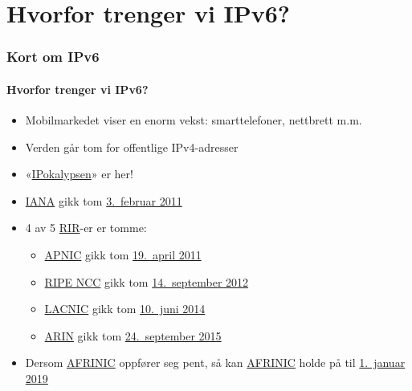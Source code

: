 \section{Hvorfor trenger vi IPv6?}
\begin{frame}%
  \frametitle{Kort om IPv6}
  \framesubtitle{Hvorfor trenger vi IPv6?}
  \pause
  \begin{itemize}[<+->]
  \item Mobilmarkedet viser en enorm vekst: smarttelefoner, nettbrett m.m.
  \item Verden går tom for offentlige IPv4-adresser
  \item
    «\href{http://www.potaroo.net/presentations/2012-05-22-terena.pdf}{IPokalypsen}»
    er her!
  \item \href{http://www.iana.org/}{IANA} gikk tom
    \href{http://www.icann.org/en/news/press/releases/release-03feb11-en.pdf}{3.~februar
      2011}
  \item 4 av 5
    \href{http://en.wikipedia.org/wiki/Regional_Internet_registry}{RIR}-er
    er tomme:
    \begin{itemize}[<+->]
    \item \href{http://www.apnic.net/}{APNIC} gikk tom
      \href{http://www.apnic.net/community/ipv4-exhaustion/graphical-information}{19.~april
        2011}
    \item \href{http://www.ripe.net/}{RIPE NCC} gikk tom
      \href{http://www.ripe.net/internet-coordination/ipv4-exhaustion}{14.~september
        2012}
    \item \href{http://www.lacnic.net/en/web/lacnic/inicio}{LACNIC}
      gikk tom
      \href{http://www.lacnic.net/en/web/lacnic/agotamiento-ipv4}{10.~juni
        2014}
    \item \href{https://www.arin.net/}{ARIN} gikk tom
      \href{https://www.arin.net/announcements/2015/20150924.html}{24.~september
        2015}
    \end{itemize}
  \item Dersom \href{http://www.afrinic.net/}{AFRINIC} oppfører seg
    pent, så kan
    \href{http://afrinic.net/en/community/ipv4-exhaustion}{AFRINIC}
    holde på til \href{http://www.potaroo.net/tools/ipv4/}{1.\ januar
      2019}
  \end{itemize}
\end{frame}

